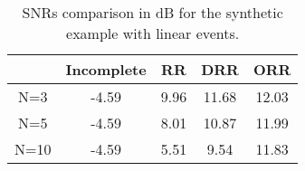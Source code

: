 {%
%




\newpage
\listoftables

\newpage
\listoffigures
\newpage


\begin{table}[h]
\caption{SNRs comparison in dB for the synthetic example with linear events.}
\begin{center}
     \begin{tabular}{|c|c|c|c|c|} 
	  \hline &Incomplete & RR  & DRR  & ORR \\ 
	  \hline N=3    & -4.59 & 9.96 & 11.68 & 12.03 \\	  
	  \hline N=5    & -4.59 & 8.01 & 10.87 & 11.99 \\
	  \hline N=10 & -4.59 & 5.51 & 9.54 & 11.83 \\
       \hline
    \end{tabular} 
\end{center}
\label{tbl:plane}
\end{table}

}

